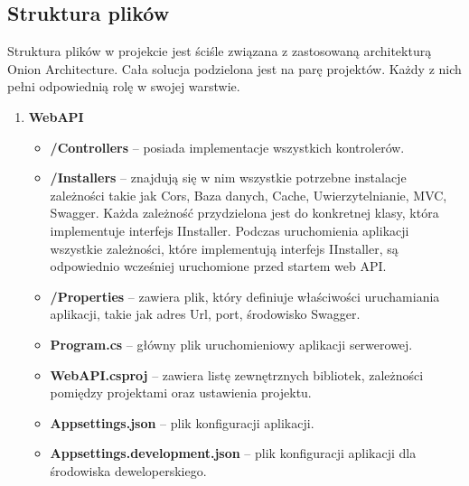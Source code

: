 \documentclass[a4paper,twoside,12pt]{book}
\begin{document}
\subsection{Struktura plików}
Struktura plików w projekcie jest ściśle związana z zastosowaną architekturą Onion Architecture.
Cała solucja podzielona jest na parę projektów. Każdy z nich pełni odpowiednią rolę w swojej warstwie.  

\begin{enumerate}
    \item \textbf{WebAPI} \begin{itemize}
        \item \textbf{/Controllers} -- posiada implementacje wszystkich kontrolerów.
        \item \textbf{/Installers} -- znajdują się w nim wszystkie potrzebne instalacje zależności takie jak Cors, Baza danych, Cache, Uwierzytelnianie, MVC, Swagger. Każda zależność przydzielona jest do konkretnej klasy, która implementuje interfejs IInstaller. Podczas uruchomienia aplikacji wszystkie zależności, które implementują interfejs IInstaller, są odpowiednio wcześniej uruchomione przed startem web API. 
        \item \textbf{/Properties} -- zawiera plik, który definiuje właściwości uruchamiania aplikacji, takie jak adres Url, port, środowisko Swagger.
        \item \textbf{Program.cs} -- główny plik uruchomieniowy aplikacji serwerowej.
        \item \textbf{WebAPI.csproj} -- zawiera listę zewnętrznych bibliotek, zależności pomiędzy projektami oraz ustawienia projektu.
        \item \textbf{Appsettings.json} -- plik konfiguracji aplikacji.
        \item \textbf{Appsettings.development.json} -- plik konfiguracji aplikacji dla środowiska deweloperskiego.
    \end{itemize}


\end{enumerate}
\end{document}
